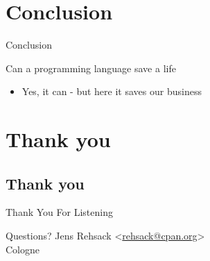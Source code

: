\documentclass[ngerman,xcolor={table,dvipsnames},smaller,compress,hyperref={bookmarks,colorlinks}]{beamer}%
\begin{document}
\section{Conclusion}

\begin{frame}[fragile]{Conclusion}
\begin{block}{Can a programming language save a life}
\begin{itemize}
\item Yes, it can - but here it saves our business
\end{itemize}
\end{block}
\end{frame}

\section{Thank you}

\subsection{Thank you}

\begin{frame}[fragile]{Thank You For Listening}
\begin{block}{Questions?}
Jens Rehsack \textless{}\href{mailto:rehsack@cpan.org}{rehsack@cpan.org}\textgreater{} \\
Cologne
\end{block}
\end{frame}
\end{document}
